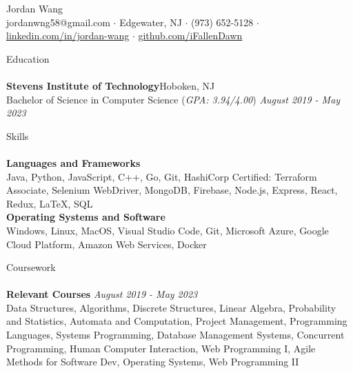 \documentclass[10pt]{article}
\newcommand{\lineunder} {
    \vspace*{-8pt} \\
    \hspace*{-18pt} \hrulefill \\
}
\newcommand{\header}[1]{
    {\hspace*{-18pt}\vspace*{6pt} #1}
    \vspace*{-6pt} \lineunder
}
\begin{document}
\vspace*{-40pt}

    

\vspace*{2pt}
\begin{center}
	{\Huge {Jordan Wang}}\\
	\vspace{2mm}
	jordanwng58@gmail.com $\cdot$ Edgewater, NJ $\cdot$ (973) 652-5128 $\cdot$ \href{https://www.linkedin.com/in/jordan-wang/}{linkedin.com/in/jordan-wang} $\cdot$ \href{https://github.com/iFallenDawn}{github.com/iFallenDawn} \\
\end{center}
\vspace{-2mm}
\header{Education}
\textbf{Stevens Institute of Technology}\hfill Hoboken, NJ\\
Bachelor of Science in Computer Science (\textit{GPA: 3.94/4.00}) \hfill \textit{August 2019 - May 2023}\\
\vspace{2mm}

\header{Skills}
{\textbf{Languages and Frameworks}} \hfill 
\\
	Java, Python, JavaScript, C++, Go, Git, HashiCorp Certified: Terraform Associate, Selenium WebDriver, MongoDB, Firebase, Node.js, Express, React, Redux, \LaTeX, SQL
 \\
\vspace{1mm}
 {\textbf{Operating Systems and Software}} \hfill 
 \\
 Windows, Linux, MacOS, Visual Studio Code, Git, Microsoft Azure, Google Cloud Platform, Amazon Web Services, Docker
\vspace{2mm}

\header{Coursework}
{\textbf{Relevant Courses}} {\sl August 2019 - May 2023} \hfill 
\\
Data Structures, Algorithms, Discrete Structures, Linear Algebra, Probability and Statistics, Automata and Computation, Project Management, Programming Languages, Systems Programming, Database Management Systems, Concurrent Programming, Human Computer Interaction, Web Programming I, Agile Methods for Software Dev, Operating Systems, Web Programming II\\
\vspace{2mm}
\end{document}
